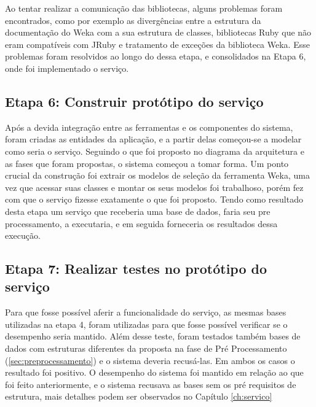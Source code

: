 Ao tentar realizar a comunicação das bibliotecas, alguns problemas foram encontrados, como por exemplo as divergências entre a estrutura da documentação do Weka com a sua estrutura de classes, bibliotecas Ruby que não eram compatíveis com JRuby e tratamento de exceções da biblioteca Weka. Esse problemas foram resolvidos ao longo do dessa etapa, e consolidados na Etapa 6, onde foi implementado o serviço.

\subsection{Etapa 6: Construir protótipo do serviço}

Após a devida integração entre as ferramentas e os componentes do sistema, foram criadas as entidades da aplicação, e a partir delas começou-se a modelar como seria o serviço. Seguindo o que foi proposto no diagrama da arquitetura e as fases que foram propostas, o sistema começou a tomar forma. Um ponto crucial da construção foi extrair os modelos de seleção da ferramenta Weka, uma vez que acessar suas classes e montar os seus modelos foi trabalhoso, porém fez com que o serviço fizesse exatamente o que foi proposto. Tendo como resultado desta etapa um serviço que receberia uma base de dados, faria seu pre processamento, a executaria, e em seguida forneceria os resultados dessa execução.


\subsection{Etapa 7: Realizar testes no protótipo do serviço}

Para que fosse possível aferir a funcionalidade do serviço, as mesmas bases utilizadas na etapa 4, foram utilizadas para que fosse possível verificar se o desempenho seria mantido. Além desse teste, foram testados também bases de dados com estruturas diferentes da proposta na fase de Pré Processamento (\ref{sec:preprocessamento}) e o sistema deveria recusá-las. Em ambos os casos o resultado foi positivo. O desempenho do sistema foi mantido em relação ao que foi feito anteriormente, e o sistema recusava as bases sem os pré requisitos de estrutura, mais detalhes podem ser observados no Capítulo \ref{ch:servico}